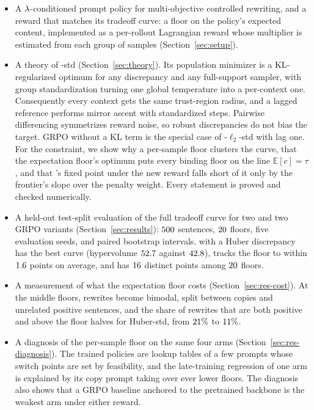 \begin{itemize}\itemsep2pt
  \item A $\lambda$-conditioned prompt policy for multi-objective controlled
        rewriting, and a reward that matches its tradeoff curve: a floor on the
        policy's expected content, implemented as a per-rollout Lagrangian
        reward whose multiplier is estimated from each group of samples
        (Section~\ref{sec:setup}).
  \item A theory of \rrebel{}-std (Section~\ref{sec:theory}). Its population
        minimizer is a KL-regularized optimum for any discrepancy and any
        full-support sampler, with group standardization turning one global
        temperature into a per-context one. Consequently every context gets the
        same trust-region radius, and a lagged reference performs mirror ascent
        with standardized steps. Pairwise differencing symmetrizes reward
        noise, so robust discrepancies do not bias the target. GRPO without a KL
        term is the special case of \rrebel{}-$\ell_2$-std with lag one. For the
        constraint, we show why a per-sample floor clusters the curve, that the
        expectation floor's optimum puts every binding floor on the line
        $\mathbb{E}[c] = \tau$, and that \rrebel{}'s fixed point under the new
        reward falls short of it only by the frontier's slope over the penalty
        weight. Every statement is proved and checked numerically.
  \item A held-out test-split evaluation of the full tradeoff curve for two
        \rrebel{} and two GRPO variants (Section~\ref{sec:results}):
        $500$ sentences, $20$ floors, five evaluation seeds, and paired
        bootstrap intervals. \rrebel{} with a Huber discrepancy has the best
        curve (hypervolume $52.7$ against $42.8$), tracks the floor
        to within $1.6$ points on average, and has $16$
        distinct points among $20$ floors.
  \item A measurement of what the expectation floor costs
        (Section~\ref{sec:res-cost}). At the middle floors, rewrites become
        bimodal, split between copies and unrelated positive sentences, and the
        share of rewrites that are both positive and above the floor halves
        for Huber-std, from $21\%$ to $11\%$.
  \item A diagnosis of the per-sample floor on the same four arms
        (Section~\ref{sec:res-diagnosis}). The trained policies are lookup tables
        of a few prompts whose switch points are set by feasibility, and the
        late-training regression of one arm is explained by its copy prompt
        taking over ever lower floors. The diagnosis also shows that a GRPO
        baseline anchored to the pretrained backbone is the weakest arm under
        either reward.
\end{itemize}
